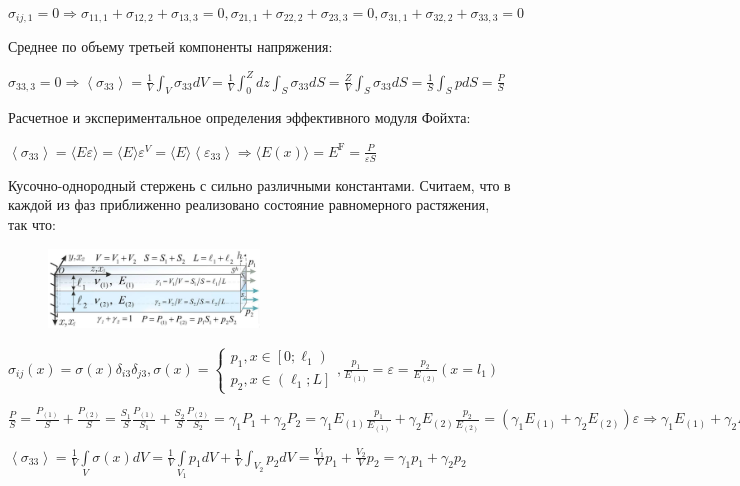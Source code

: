 $
\sigma_{i j, 1}=0 \Rightarrow \sigma_{11,1}+\sigma_{12,2}+\sigma_{13,3}=0, \sigma_{21,1}+\sigma_{22,2}+\sigma_{23,3}=0, \sigma_{31,1}+\sigma_{32,2}+\sigma_{33,3}=0
$

Среднее по объему третьей компоненты напряжения: 

$\sigma_{33,3}=0 \Rightarrow\left\langle\sigma_{33}\right\rangle=\frac{1}{V} \int_{V} \sigma_{33} d V=\frac{1}{V} \int_{0}^{Z} d z \int_{S} \sigma_{33} d S=\frac{Z}{V} \int_{S} \sigma_{33} d S=\frac{1}{S} \int_{S} p d S=\frac{P}{S}$

Расчетное и экспериментальное определения эффективного модуля Фойхта:

$\left\langle\sigma_{33}\right\rangle=\langle E \varepsilon\rangle=\langle E\rangle \varepsilon^{V}=\langle E\rangle\left\langle\varepsilon_{33}\right\rangle \Rightarrow\langle E(x)\rangle=E^{\mathrm{F}}=\frac{P}{\varepsilon S}$

Кусочно-однородный стержень с сильно различными константами. Считаем, что в каждой из фаз приближенно реализовано состояние равномерного растяжения, так что:

\begin{figure}[h!]
  \centering
  \includegraphics[width=0.5\textwidth]{images/19.3.jpg}
\end{figure}




$\sigma_{i j}(x)=\sigma(x) \delta_{i3} \delta_{j3}, \sigma(x)=\left\{\begin{array}{l}
p_1, x \in\left[0 ; \ell_1\right) \\
p_2, x \in\left(\ell_1 ; L\right]
\end{array}, \frac{p_1}{E_{(1)}}=\varepsilon=\frac{p_2}{E_{(2)}}\right. (x=l_1)$



$
\displaystyle
    \frac{P}{S}=\frac{P_{(1)}}{S}+\frac{P_{(2)}}{S}=\frac{S_1}{S} \frac{P_{(1)}}{S_1}+\frac{S_2}{S} \frac{P_{(2)}}{S_2}=\gamma_1 P_1+\gamma_2 P_2=\gamma_1 E_{(1)} \frac{p_1}{E_{(1)}}+\gamma_2 E_{(2)} \frac{p_2}{E_{(2)}}=\left(\gamma_1 E_{(1)}+\gamma_2 E_{(2)}\right) \varepsilon\Rightarrow\gamma_1 E_{(1)}+\gamma_2 E_{(2)}=\frac{P}{\varepsilon S}
$


$
\displaystyle
    \left\langle\sigma_{33}\right\rangle=\frac{1}{V} \int \limits_{V} \sigma(x) d V=\frac{1}{V} \int \limits_{V_1} p_1 d V+\frac{1}{V} \int_{V_2} p_2 d V=\frac{V_1}{V} p_1+\frac{V_2}{V} p_2=\gamma_1 p_1+\gamma_2 p_2 
$


